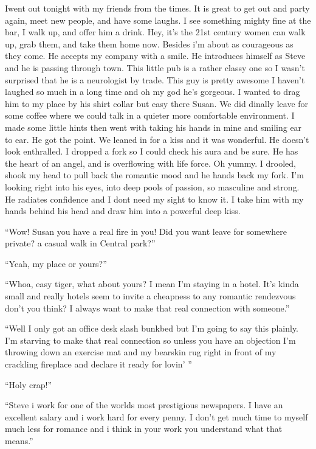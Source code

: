 \lettrine[lines=2,lraise=0]{I}\space went out tonight with my friends from the times. It is great to get out and party again, meet new people, and have some laughs. I see something mighty fine at the bar, I walk up, and offer him a drink. Hey, it's the 21st century women can walk up, grab them, and take them home now. Besides i'm about as courageous as they come. He accepts my company with a smile. He introduces himself as Steve and he is passing through town. This little pub is a rather classy one so I wasn't surprised that he is a neurologist by trade. This guy is pretty awesome I haven't laughed so much in a long time and oh my god he's gorgeous. I wanted to drag him to my place by his shirt collar but easy there Susan. We did dinally leave for some coffee where we could talk in a quieter more comfortable environment. I made some little hints then went with taking his hands in mine and smiling ear to ear. He got the point. We leaned in for a kiss and it was wonderful. He doesn't look enthralled. I dropped a fork so I could check his aura and be sure. He has the heart of an angel, and is overflowing with life force. Oh yummy. I drooled, shook my head to pull back the romantic mood and he hands back my fork. I'm looking right into his eyes, into deep pools of passion, so masculine and strong. He radiates confidence and I dont need my sight to know it. I take him with my hands behind his head and draw him into a powerful deep kiss. 

``Wow! Susan you have a real fire in you! Did you want leave for somewhere private? a casual walk in Central park?'' 

``Yeah, my place or yours?''

``Whoa, easy tiger, what about yours? I mean I'm staying in a hotel. It's kinda small and really hotels seem to invite a cheapness to any romantic rendezvous don't you think? I always want to make that real connection with someone.''

``Well I only got an office desk slash bunkbed but I'm going to say this plainly. I'm starving to make that real connection so unless you have an objection I'm throwing down an exercise mat and my bearskin rug right in front of my crackling fireplace and declare it ready for lovin' ''

``Holy crap!''

``Steve i work for one of the worlds most prestigious newspapers. I have an excellent salary and i work hard for every penny. I don't get much time to myself much less for romance and i think in your work you understand what that means.''

